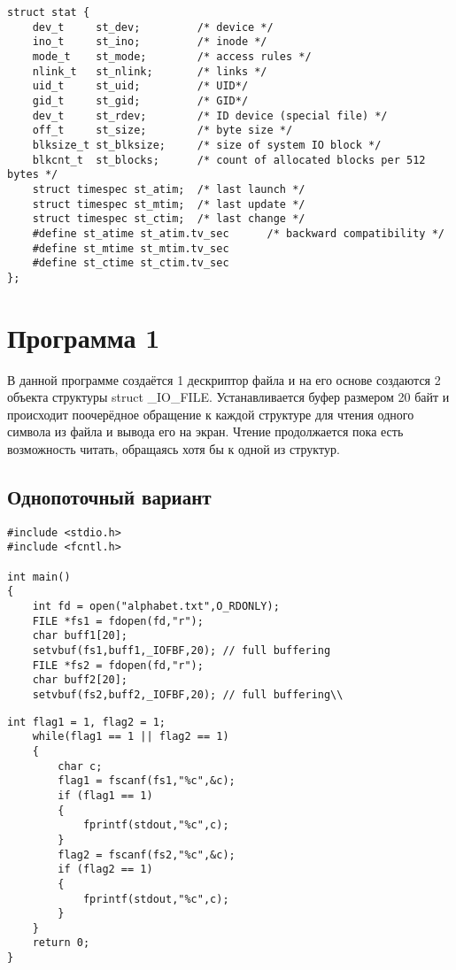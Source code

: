 \pagebreak

\begin{lstlisting}[caption=Структура filename]
struct stat {
	dev_t     st_dev;         /* device */
	ino_t     st_ino;         /* inode */
	mode_t    st_mode;        /* access rules */
	nlink_t   st_nlink;       /* links */
	uid_t     st_uid;         /* UID*/
	gid_t     st_gid;         /* GID*/
	dev_t     st_rdev;        /* ID device (special file) */
	off_t     st_size;        /* byte size */
	blksize_t st_blksize;     /* size of system IO block */
	blkcnt_t  st_blocks;      /* count of allocated blocks per 512 bytes */
	struct timespec st_atim;  /* last launch */
	struct timespec st_mtim;  /* last update */
	struct timespec st_ctim;  /* last change */
	#define st_atime st_atim.tv_sec      /* backward compatibility */
	#define st_mtime st_mtim.tv_sec
	#define st_ctime st_ctim.tv_sec
};
\end{lstlisting}


\section*{Программа 1}

В данной программе создаётся 1 дескриптор файла и на его основе создаются 2 объекта структуры struct \_IO\_FILE.
Устанавливается буфер размером 20 байт и происходит поочерёдное обращение к каждой структуре для чтения одного символа из файла и вывода его на экран. Чтение продолжается пока есть возможность читать, обращаясь хотя бы к одной из структур.

\subsection*{Однопоточный вариант}

\begin{lstlisting}[caption=Однопоточный вариант]
#include <stdio.h>
#include <fcntl.h>

int main()
{
	int fd = open("alphabet.txt",O_RDONLY);
	FILE *fs1 = fdopen(fd,"r");
	char buff1[20];
	setvbuf(fs1,buff1,_IOFBF,20); // full buffering
	FILE *fs2 = fdopen(fd,"r");
	char buff2[20];
	setvbuf(fs2,buff2,_IOFBF,20); // full buffering\\
\end{lstlisting}
\begin{lstlisting}[caption=Однопоточный вариант]
	int flag1 = 1, flag2 = 1;
	while(flag1 == 1 || flag2 == 1)
	{
		char c;
		flag1 = fscanf(fs1,"%c",&c);
		if (flag1 == 1) 
		{
			fprintf(stdout,"%c",c);
		}
		flag2 = fscanf(fs2,"%c",&c);
		if (flag2 == 1) 
		{ 
			fprintf(stdout,"%c",c); 
		}
	}
	return 0;
}
\end{lstlisting}

